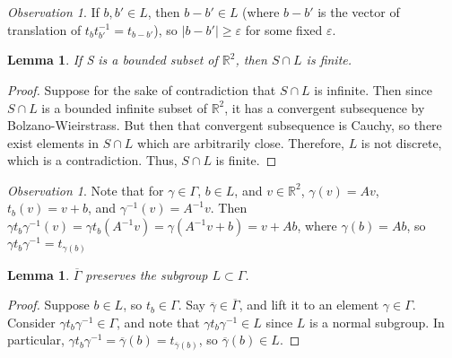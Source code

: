 \documentclass[12pt]{article}
\newtheorem{lem}[thm]{Lemma}  %
\theoremstyle{definition}
\theoremstyle{remark}
\newtheorem{obs}[thm]{Observation}
\numberwithin{equation}{section}
\newcommand\R{\mathbb R}    %
\begin{document}
\vspace{15pt}

\begin{obs}
        If $b,b' \in L$, then $b-b' \in L$ (where $b-b'$ is the vector of translation of $t_bt_{b'}^{-1} = t_{b-b'}$), so $|b-b'| \geq \varepsilon$ for some fixed $\varepsilon$.
\end{obs}


\vspace{15pt}

\begin{lem}
        If S is a bounded subset of $\R^2$, then $S \cap L$ is finite.
\end{lem}
\begin{proof}
        Suppose for the sake of contradiction that $S \cap L$ is infinite. Then since $S \cap L$ is a bounded infinite subset of $\R^2$, it has a convergent subsequence by Bolzano-Wieirstrass. But then that convergent subsequence is Cauchy, so there exist elements in $S\cap L$ which are arbitrarily close. Therefore, $L$ is not discrete, which is a contradiction. Thus, $S \cap L$ is finite.
\end{proof}

\vspace{15pt}

\begin{obs}
        Note that for $\gamma \in \Gamma$, $b \in L$, and $v \in \R^2$, $\gamma(v) = Av$, $t_b(v) = v+b$, and $\gamma^{-1}(v) = A^{-1}v$. Then $\gamma t_b\gamma^{-1}(v) = \gamma t_b(A^{-1}v) = \gamma(A^{-1}v+b) = v + Ab$, where $\gamma(b) = Ab$, so $\gamma t_b\gamma^{-1} = t_{\gamma(b)}$
\end{obs}

\vspace{15pt}


\begin{lem}
        $\overline{\Gamma}$ preserves the subgroup $L \subset \Gamma$.
\end{lem}
\begin{proof}
        Suppose $b \in L$, so $t_b \in \Gamma$. Say $\overline{\gamma} \in \overline{\Gamma}$, and lift it to an element $\gamma \in \Gamma$. Consider $\gamma t_b \gamma^{-1} \in \Gamma$, and note that $\gamma t_b \gamma^{-1} \in L$ since $L$ is a normal subgroup. In particular, $\gamma t_b \gamma^{-1} = \overline{\gamma}(b) = t_{\overline{\gamma}(b)}$, so $\overline{\gamma}(b) \in L$.
\end{proof}

\vspace{15pt}
\end{document}
